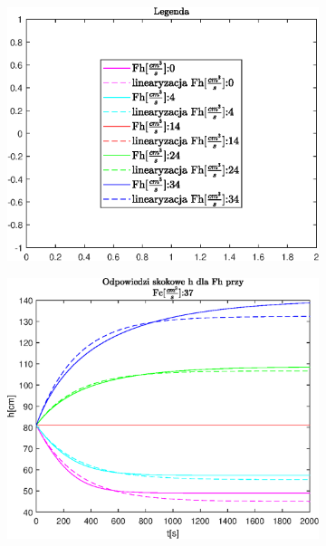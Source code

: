 \begin{figure}[h!]
   \centering
   \begin{subfigure}[b]{0.6\textwidth}
      \includegraphics[width=1\linewidth]{img/step-responses-fh/legendFc.eps}
      \caption{}
      \label{fig:fig:stepResponsesFh1}
   \end{subfigure}
       
   \begin{subfigure}[b]{0.6\textwidth}
      \includegraphics[width=1\linewidth]{img/step-responses-fh/stepResponseHFh.eps}
      \caption{}
      \label{fig:fig:stepResponsesFh2}
   \end{subfigure}
       

\end{figure}
